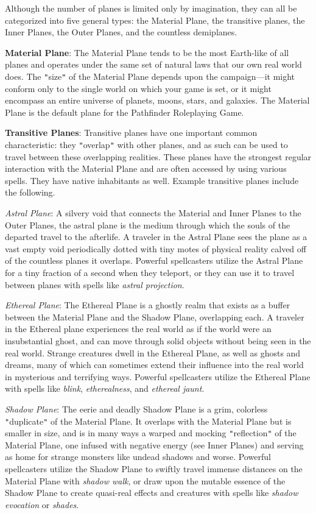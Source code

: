 Although the number of planes is limited only by imagination, they can all be categorized into five general types: the Material Plane, the transitive planes, the Inner Planes, the Outer Planes, and the countless demiplanes.
				
\textbf{Material Plane}: The Material Plane tends to be the most Earth-like of all planes and operates under the same set of natural laws that our own real world does. The \texttt{{}"{}}size\texttt{{}"{}} of the Material Plane depends upon the campaign---it might conform only to the single world on which your game is set, or it might encompass an entire universe of planets, moons, stars, and galaxies. The Material Plane is the default plane for the Pathfinder Roleplaying Game.
				
\textbf{Transitive Planes}: Transitive planes have one important common characteristic: they \texttt{{}"{}}overlap\texttt{{}"{}} with other planes, and as such can be used to travel between these overlapping realities. These planes have the strongest regular interaction with the Material Plane and are often accessed by using various spells. They have native inhabitants as well. Example transitive planes include the following.
				
\textit{Astral Plane}: A silvery void that connects the Material and Inner Planes to the Outer Planes, the astral plane is the medium through which the souls of the departed travel to the afterlife. A traveler in the Astral Plane sees the plane as a vast empty void periodically dotted with tiny motes of physical reality calved off of the countless planes it overlaps. Powerful spellcasters utilize the Astral Plane for a tiny fraction of a second when they teleport, or they can use it to travel between planes with spells like \textit{astral projection}.
				
\textit{Ethereal Plane}: The Ethereal Plane is a ghostly realm that exists as a buffer between the Material Plane and the Shadow Plane, overlapping each. A traveler in the Ethereal plane experiences the real world as if the world were an insubstantial ghost, and can move through solid objects without being seen in the real world. Strange creatures dwell in the Ethereal Plane, as well as ghosts and dreams, many of which can sometimes extend their influence into the real world in mysterious and terrifying ways. Powerful spellcasters utilize the Ethereal Plane with spells like \textit{blink}, \textit{etherealness}, and \textit{ethereal jaunt}.
				
\textit{Shadow Plane}: The eerie and deadly Shadow Plane is a grim, colorless \texttt{{}"{}}duplicate\texttt{{}"{}} of the Material Plane. It overlaps with the Material Plane but is smaller in size, and is in many ways a warped and mocking \texttt{{}"{}}reflection\texttt{{}"{}} of the Material Plane, one infused with negative energy (see Inner Planes) and serving as home for strange monsters like undead shadows and worse. Powerful spellcasters utilize the Shadow Plane to swiftly travel immense distances on the Material Plane with \textit{shadow walk}, or draw upon the mutable essence of the Shadow Plane to create quasi-real effects and creatures with spells like \textit{shadow evocation} or \textit{shades}.
				
